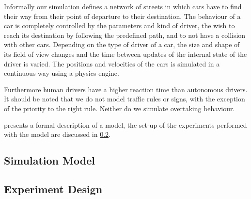 Informally our simulation defines a network of streets in which cars have to find their way from their point of departure to their destination. The behaviour of a car is completely controlled by the parameters and kind of driver, the wish to reach its destination by following the predefined path, and to not have a collision with other cars. Depending on the type of driver of a car, the size and shape of its field of view changes and the time between updates of the internal state of the driver is varied. The positions and velocities of the cars is simulated in a continuous way using a physics engine. 

Furthermore human drivers have a higher reaction time than autonomous drivers. It should be noted that we do not model traffic rules or signs, with the exception of the priority to the right rule. Neither do we simulate overtaking behaviour.

 presents a formal description of a model, the set-up of the experiments performed with the model are discussed in \cref{sub:method:design}.

\subsection{Simulation Model}
\label{sub:method:model}



\subsection{Experiment Design}
\label{sub:method:design}
